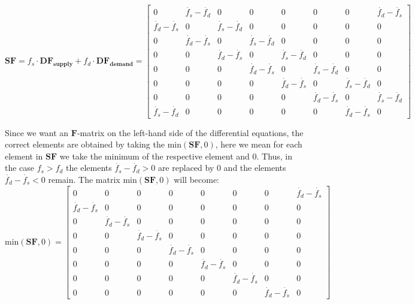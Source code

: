 \begin{scriptsize}
	\begin{equation}
		\mathbf{SF} = f_s \cdot \mathbf{DF_{supply}} + f_d \cdot \mathbf{DF_{demand}} = 
		\begin{bmatrix}
			0 & \dot{f_s}-\dot{f_d} & 0 & 0 & 0 & 0 & 0 & \dot{f_d}-\dot{f_s} \\
			\dot{f_d}-\dot{f_s} & 0 & \dot{f_s}-\dot{f_d} & 0 & 0 & 0 & 0 & 0 \\
			0 & \dot{f_d}-\dot{f_s} & 0 & \dot{f_s}-\dot{f_d} & 0 & 0 & 0 & 0 \\
			0 & 0 & \dot{f_d}-\dot{f_s} & 0 & \dot{f_s}-\dot{f_d} & 0 & 0 & 0 \\
			0 & 0 & 0 & \dot{f_d}-\dot{f_s} & 0 & \dot{f_s}-\dot{f_d} & 0 & 0 \\
			0 & 0 & 0 & 0 & \dot{f_d}-\dot{f_s} & 0 & \dot{f_s}-\dot{f_d} & 0 \\
			0 & 0 & 0 & 0 & 0 & \dot{f_d}-\dot{f_s} & 0 & \dot{f_s}-\dot{f_d} \\
			\dot{f_s}-\dot{f_d} & 0 & 0 & 0 & 0 & 0 & \dot{f_d}-\dot{f_s} & 0
		\end{bmatrix}
		\label{eq:addbufferflows}
	\end{equation}
	
	Since we want an $\mathbf{F}$-matrix on the left-hand side of the differential equations, the correct elements are obtained by taking the $\text{min}(\mathbf{SF},0)$, here we mean for each element in $\mathbf{SF}$ we take the minimum of the respective element and 0. 
	Thus, in the case $f_s>f_d$ the elements $\dot{f_s}-\dot{f_d} > 0 $ are replaced by 0 and the elements $\dot{f_d}-\dot{f_s} < 0 $ remain. The matrix $\text{min}(\mathbf{SF},0)$ will become:
	\begin{equation}
		\text{min}(\mathbf{SF},0) = 
		\begin{bmatrix}
			0 & 0 & 0 & 0 & 0 & 0 & 0 & \dot{f_d}-\dot{f_s} \\
			\dot{f_d}-\dot{f_s} & 0 & 0 & 0 & 0 & 0 & 0 & 0 \\
			0 & \dot{f_d}-\dot{f_s} & 0 & 0 & 0 & 0 & 0 & 0 \\
			0 & 0 & \dot{f_d}-\dot{f_s} & 0 & 0 & 0 & 0 & 0 \\
			0 & 0 & 0 & \dot{f_d}-\dot{f_s} & 0 & 0 & 0 & 0 \\
			0 & 0 & 0 & 0 & \dot{f_d}-\dot{f_s} & 0 & 0 & 0 \\
			0 & 0 & 0 & 0 & 0 & \dot{f_d}-\dot{f_s} & 0 & 0 \\
			0 & 0 & 0 & 0 & 0 & 0 & \dot{f_d}-\dot{f_s} & 0
		\end{bmatrix}
		\label{eq:minSFzero_8}
	\end{equation}
	

\end{scriptsize}
